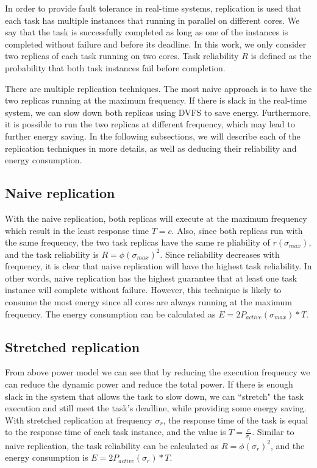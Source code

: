 In order to provide fault tolerance in real-time systems, replication is used that each task has multiple instances that running in parallel on different cores. We say that the task is successfully completed as long as one of the instances is completed without failure and before its deadline. In this work, we only consider two replicas of each task running on two cores. 
Task reliability $R$ is defined as the probability that both task instances fail before completion. 

There are multiple replication techniques. The most naive approach is to have the two replicas running at the maximum frequency. If there is slack in the real-time system, we can slow down both replicas using DVFS to save energy. Furthermore, it is possible to run the two replicas at different frequency, which may lead to further energy saving. In the following subsections, we will describe each of the replication techniques in more details, as well as deducing their reliability and energy consumption.

\subsection{Naive replication}
With the naive replication, both replicas will execute at the maximum frequency which result in the least response time $T=c$.  
Also, since both replicas run with the same frequency, the two task replicas have the same re pliability of $r(\sigma_{max})$, and the task reliability is $R=\phi(\sigma_{max})^2$. Since reliability decreases with frequency, it is clear that naive replication will have the highest task reliability. In other words, naive replication has the highest guarantee that at least one task instance will complete without failure. However, this technique is likely to consume the most energy since all cores are always running at the maximum frequency. The energy consumption can be calculated as $E=2P_{active}(\sigma_{max}) * T$.

\subsection{Stretched replication}
From above power model we can see that by reducing the execution frequency we can reduce the dynamic power and reduce the total power. If there is enough slack in the system that allows the task to slow down, we can ``stretch" the task execution and still meet the task's deadline, while providing some energy saving. With stretched replication at frequency $\sigma_r$, the response time of the task is equal to the response time of each task instance, and the value is $T=\frac{c}{\sigma_r}$. Similar to naive replication, the task reliability can be calculated as $R= \phi(\sigma_r)^2$, and the energy consumption is $E=2P_{active}(\sigma_r) * T$.

